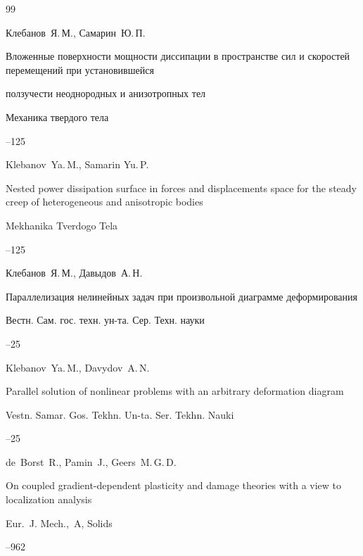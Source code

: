 \begin{thebibliography}{99}

\by Клебанов~Я.\,М., Самарин~Ю.\,П.

\paper Вложенные поверхности мощности диссипации в пространстве сил и скоростей перемещений при установившейся

ползучести неоднородных и анизотропных тел

\jour  Механика твердого тела



--125

\misctransl

\by Klebanov~Ya.\,M., Samarin Yu.\,P.

\paper Nested  power dissipation surface  in forces and displacements space for the steady creep of heterogeneous and anisotropic bodies

\jour Mekhanika Tverdogo Tela



--125






\by Клебанов~Я.\,М., Давыдов~А.\,Н.

\paper Параллелизация нелинейных задач при произвольной диаграмме деформирования

\jour Вестн. Сам. гос. техн. ун-та. Сер. Техн. науки



--25

\misctransl

\by Klebanov~Ya.\,M., Davydov~A.\,N.

\paper Parallel solution of nonlinear problems with an arbitrary deformation diagram

\jour Vestn. Samar. Gos. Tekhn. Un-ta. Ser. Tekhn. Nauki



--25






\by de~Borst~R., Pamin~J., Geers~M.\,G.\,D.

\paper On coupled gradient-dependent plasticity and damage theories with a view to localization analysis

\jour Eur.~J. Mech.,~A, Solids




--962





\end{thebibliography}







